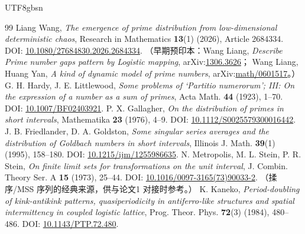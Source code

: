 \documentclass[11pt,a4paper]{article}
\theoremstyle{plain}
\theoremstyle{definition}
\begin{document}
\begin{CJK}{UTF8}{gbsn}
\begin{thebibliography}{99}
 Liang Wang, \emph{The emergence of prime distribution from low-dimensional deterministic chaos},
Research in Mathematics \textbf{13}(1) (2026), Article 2684334. DOI: \url{10.1080/27684830.2026.2684334}.
（早期预印本：Wang Liang, \emph{Describe Prime number gaps pattern by Logistic mapping}, arXiv:\url{1306.3626}；
Wang Liang, Huang Yan, \emph{A kind of dynamic model of prime numbers}, arXiv:\url{math/0601517}。）
 G. H. Hardy, J. E. Littlewood, \emph{Some problems of `Partitio numerorum'; III: On the expression of a number as a sum of primes},
Acta Math. \textbf{44} (1923), 1--70. DOI: \url{10.1007/BF02403921}.
 P. X. Gallagher, \emph{On the distribution of primes in short intervals}, Mathematika \textbf{23} (1976), 4--9.
DOI: \url{10.1112/S0025579300016442}.
 J. B. Friedlander, D. A. Goldston, \emph{Some singular series averages and the distribution of Goldbach numbers in short intervals},
Illinois J. Math. \textbf{39}(1) (1995), 158--180. DOI: \url{10.1215/ijm/1255986635}.
 N. Metropolis, M. L. Stein, P. R. Stein, \emph{On finite limit sets for transformations on the unit interval},
J. Combin. Theory Ser. A \textbf{15} (1973), 25--44. DOI: \url{10.1016/0097-3165(73)90033-2}.
（揉序/MSS 序列的经典来源，供与论文1 对接时参考。）
 K. Kaneko, \emph{Period-doubling of kink-antikink patterns, quasiperiodicity in antiferro-like structures and spatial intermittency in coupled logistic lattice},
Prog. Theor. Phys. \textbf{72}(3) (1984), 480--486. DOI: \url{10.1143/PTP.72.480}.
\end{thebibliography}

\end{CJK}
\end{document}

